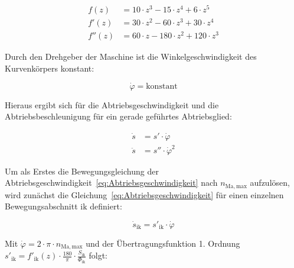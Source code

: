 \begin{align}
f(z) &= 10 \cdot z^3 - 15 \cdot z^4 + 6 \cdot z^5 \\
f'(z) &= 30 \cdot z^2 - 60 \cdot z^3 + 30 \cdot z^4 \\
f''(z) &= 60 \cdot z - 180 \cdot z^2 + 120 \cdot z^3 
\end{align}





Durch den Drehgeber der Maschine ist die Winkelgeschwindigkeit des Kurvenkörpers konstant:

\begin{equation}\label{eq:2}
\dot{\varphi} = \mathrm{konstant}
\end{equation}

Hieraus ergibt sich für die Abtriebsgeschwindigkeit und die Abtriebsbeschleunigung für ein gerade geführtes Abtriebsglied:



\begin{align}
\dot{s} &= s' \cdot \dot{\varphi}  \label{eq:Abtriebsgeschwindigkeit}\\
\ddot{s} &= s'' \cdot {\dot{\varphi}}^2 \label{eq:Abtriebsbeschleunigung}
\end{align}










Um als Erstes die Bewegungsgleichung der Abtriebsgeschwindigkeit~\ref{eq:Abtriebsgeschwindigkeit} nach $n_{\mathrm{Ma, max}}$ aufzulösen, wird zunächst die Gleichung~\ref{eq:Abtriebsgeschwindigkeit} für einen einzelnen Bewegungsabschnitt $\mathrm{ik}$ definiert:



\begin{equation}
\dot{s}_{\mathrm{ik}} = s'_{\mathrm{ik}} \cdot \dot{\varphi}
\end{equation}

Mit $\dot{\varphi}  = 2 \cdot \pi \cdot  n_{\mathrm{Ma, max}} $ und der Übertragungsfunktion 1. Ordnung $s'_{\mathrm{ik}} = f'_{\mathrm{ik}}(z) \cdot \frac{180}{\pi} \cdot \frac{S_{\mathrm{ik}}}{\Phi_{\mathrm{ik}}}$ folgt:

